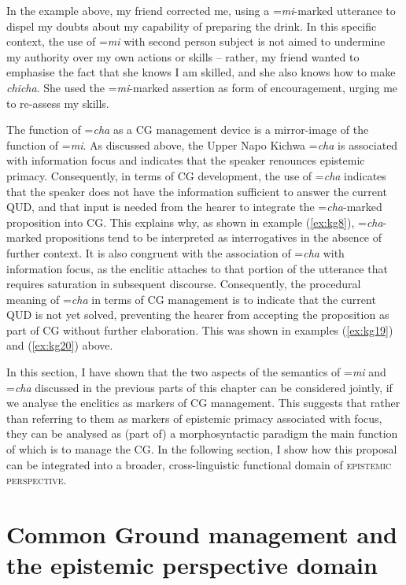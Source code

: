 \documentclass[output=paper]{langscibook}
\begin{document}
In the example above, my friend corrected me, using a =\textit{mi}-marked utterance to dispel my doubts about my capability of preparing the drink. In this specific context, the use of =\textit{mi} with second person subject is not aimed to undermine my authority over my own actions or skills – rather, my friend wanted to emphasise the fact that she knows I am skilled, and she also knows how to make \textit{chicha}. She used the =\textit{mi}-marked assertion as form of encouragement, urging me to re-assess my skills.

The function of =\textit{cha} as a CG management device is a mirror-image of the function of =\textit{mi}. As discussed above, the Upper Napo Kichwa =\textit{cha} is associated with information focus and indicates that the speaker renounces epistemic primacy. Consequently, in terms of CG development, the use of =\textit{cha} indicates that the speaker does not have the information sufficient to answer the current QUD, and that input is needed from the hearer to integrate the =\textit{cha}-marked proposition into CG. This explains why, as shown in example (\ref{ex:kg8}), =\textit{cha}-marked propositions tend to be interpreted as interrogatives in the absence of further context. It is also congruent with the association of =\textit{cha} with information focus, as the enclitic attaches to that portion of the utterance that requires saturation in subsequent discourse. Consequently, the procedural meaning of =\textit{cha} in terms of CG management is to indicate that the current QUD is not yet solved, preventing the hearer from accepting the proposition as part of CG without further elaboration. This was shown in examples (\ref{ex:kg19}) and (\ref{ex:kg20}) above. 

In this section, I have shown that the two aspects of the semantics of =\textit{mi} and =\textit{cha} discussed in the previous parts of this chapter can be considered jointly, if we analyse the enclitics as markers of CG management. This suggests that rather than referring to them as markers of epistemic primacy associated with focus, they can be analysed as (part of) a morphosyntactic paradigm the main function of which is to manage the CG. In the following section, I show how this proposal can be integrated into a broader, cross-linguistic functional domain of \textsc{epistemic perspective}. 


\section{Common Ground management and the epistemic perspective domain}\label{s:kg6}
\end{document}
